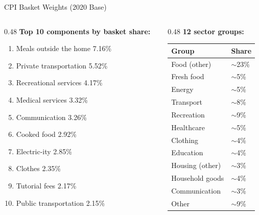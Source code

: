 \documentclass[aspectratio=169, 11pt]{beamer}
\begin{document}
\begin{frame}{CPI Basket Weights (2020 Base)}
  \begin{columns}[T]
    \begin{column}{0.48\textwidth}
      \small
      \textbf{Top 10 components by basket share:}
      \begin{enumerate}
        \item Meals outside the home \hfill 7.16\%
        \item Private transportation \hfill 5.52\%
        \item Recreational services \hfill 4.17\%
        \item Medical services \hfill 3.32\%
        \item Communication \hfill 3.26\%
        \item Cooked food \hfill 2.92\%
        \item Electric-ity \hfill 2.85\%
        \item Clothes \hfill 2.35\%
        \item Tutorial fees \hfill 2.17\%
        \item Public transportation \hfill 2.15\%
      \end{enumerate}
    \end{column}
    \begin{column}{0.48\textwidth}
      \small
      \textbf{12 sector groups:}\\[4pt]
      \begin{tabular}{ll}
        \toprule
        Group & Share \\
        \midrule
        Food (other) & $\sim$23\% \\
        Fresh food & $\sim$5\% \\
        Energy & $\sim$5\% \\
        Transport & $\sim$8\% \\
        Recreation & $\sim$9\% \\
        Healthcare & $\sim$5\% \\
        Clothing & $\sim$4\% \\
        Education & $\sim$4\% \\
        Housing (other) & $\sim$3\% \\
        Household goods & $\sim$4\% \\
        Communication & $\sim$3\% \\
        Other & $\sim$9\% \\
        \bottomrule
      \end{tabular}
    \end{column}
  \end{columns}
\end{frame}
\end{document}
